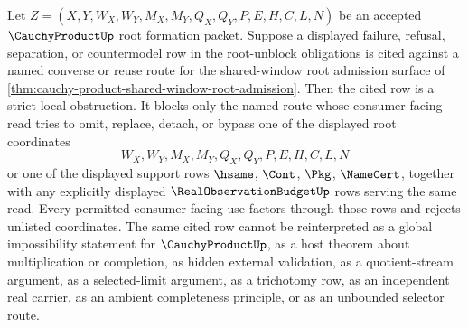 \begin{corollary}
\label{cor:cauchy-product-shared-window-root-strict-obstruction}
Let $Z=(X,Y,W_X,W_Y,M_X,M_Y,Q_X,Q_Y,P,E,H,C,L,N)$ be an accepted $\CauchyProductUp$ root formation packet. Suppose a displayed failure, refusal, separation, or countermodel row in the root-unblock obligations is cited against a named converse or reuse route for the shared-window root admission surface of \autoref{thm:cauchy-product-shared-window-root-admission}. Then the cited row is a strict local obstruction. It blocks only the named route whose consumer-facing read tries to omit, replace, detach, or bypass one of the displayed root coordinates
$$
W_X,W_Y,M_X,M_Y,Q_X,Q_Y,P,E,H,C,L,N
$$
or one of the displayed support rows $\hsame$, $\Cont$, $\Pkg$, $\NameCert$, together with any explicitly displayed $\RealObservationBudgetUp$ rows serving the same read. Every permitted consumer-facing use factors through those rows and rejects unlisted coordinates. The same cited row cannot be reinterpreted as a global impossibility statement for $\CauchyProductUp$, as a host theorem about multiplication or completion, as hidden external validation, as a quotient-stream argument, as a selected-limit argument, as a trichotomy row, as an independent real carrier, as an ambient completeness principle, or as an unbounded selector route.
\end{corollary}
